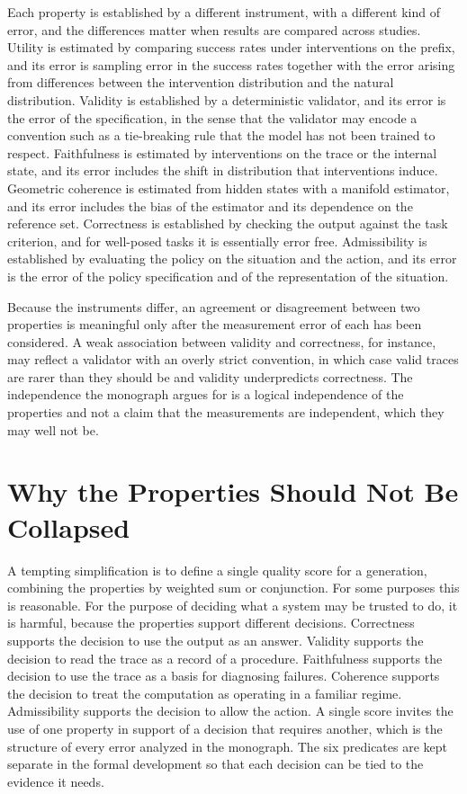 Each property is established by a different instrument, with a different kind of error, and the differences matter when results are compared across studies. Utility is estimated by comparing success rates under interventions on the prefix, and its error is sampling error in the success rates together with the error arising from differences between the intervention distribution and the natural distribution. Validity is established by a deterministic validator, and its error is the error of the specification, in the sense that the validator may encode a convention such as a tie-breaking rule that the model has not been trained to respect. Faithfulness is estimated by interventions on the trace or the internal state, and its error includes the shift in distribution that interventions induce. Geometric coherence is estimated from hidden states with a manifold estimator, and its error includes the bias of the estimator and its dependence on the reference set. Correctness is established by checking the output against the task criterion, and for well-posed tasks it is essentially error free. Admissibility is established by evaluating the policy on the situation and the action, and its error is the error of the policy specification and of the representation of the situation.

Because the instruments differ, an agreement or disagreement between two properties is meaningful only after the measurement error of each has been considered. A weak association between validity and correctness, for instance, may reflect a validator with an overly strict convention, in which case valid traces are rarer than they should be and validity underpredicts correctness. The independence the monograph argues for is a logical independence of the properties and not a claim that the measurements are independent, which they may well not be.

\section{Why the Properties Should Not Be Collapsed}

A tempting simplification is to define a single quality score for a generation, combining the properties by weighted sum or conjunction. For some purposes this is reasonable. For the purpose of deciding what a system may be trusted to do, it is harmful, because the properties support different decisions. Correctness supports the decision to use the output as an answer. Validity supports the decision to read the trace as a record of a procedure. Faithfulness supports the decision to use the trace as a basis for diagnosing failures. Coherence supports the decision to treat the computation as operating in a familiar regime. Admissibility supports the decision to allow the action. A single score invites the use of one property in support of a decision that requires another, which is the structure of every error analyzed in the monograph. The six predicates are kept separate in the formal development so that each decision can be tied to the evidence it needs.

